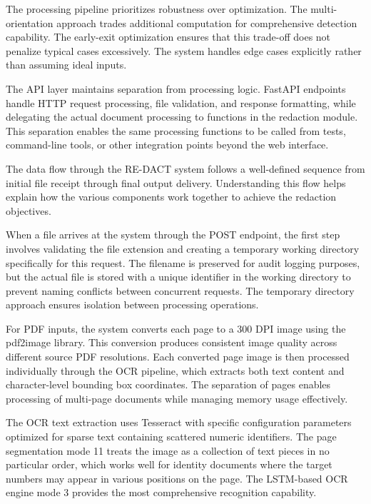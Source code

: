 The processing pipeline prioritizes robustness over optimization. The multi-orientation approach trades additional computation for comprehensive detection capability. The early-exit optimization ensures that this trade-off does not penalize typical cases excessively. The system handles edge cases explicitly rather than assuming ideal inputs.

The API layer maintains separation from processing logic. FastAPI endpoints handle HTTP request processing, file validation, and response formatting, while delegating the actual document processing to functions in the redaction module. This separation enables the same processing functions to be called from tests, command-line tools, or other integration points beyond the web interface.

\bigskip

The data flow through the RE-DACT system follows a well-defined sequence from initial file receipt through final output delivery. Understanding this flow helps explain how the various components work together to achieve the redaction objectives.

When a file arrives at the system through the POST endpoint, the first step involves validating the file extension and creating a temporary working directory specifically for this request. The filename is preserved for audit logging purposes, but the actual file is stored with a unique identifier in the working directory to prevent naming conflicts between concurrent requests. The temporary directory approach ensures isolation between processing operations.

For PDF inputs, the system converts each page to a 300 DPI image using the pdf2image library. This conversion produces consistent image quality across different source PDF resolutions. Each converted page image is then processed individually through the OCR pipeline, which extracts both text content and character-level bounding box coordinates. The separation of pages enables processing of multi-page documents while managing memory usage effectively.

The OCR text extraction uses Tesseract with specific configuration parameters optimized for sparse text containing scattered numeric identifiers. The page segmentation mode 11 treats the image as a collection of text pieces in no particular order, which works well for identity documents where the target numbers may appear in various positions on the page. The LSTM-based OCR engine mode 3 provides the most comprehensive recognition capability.

